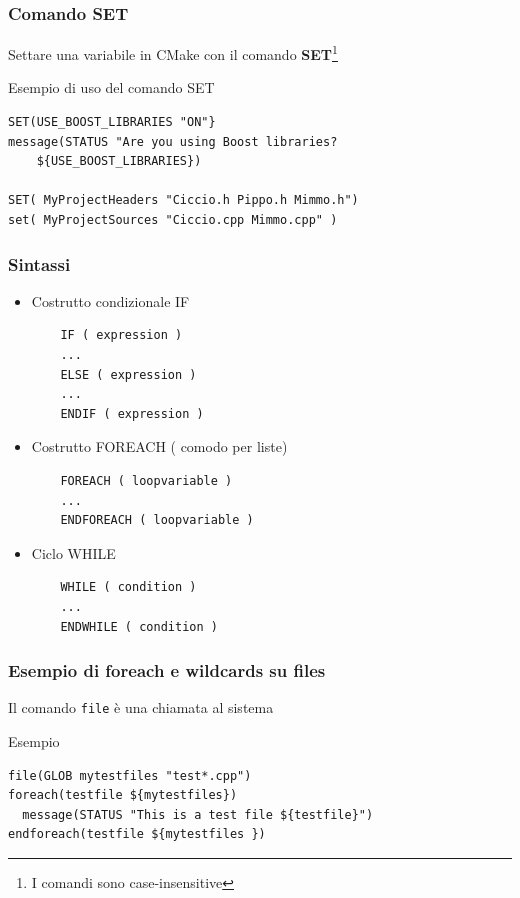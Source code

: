 \documentclass[10pt] {beamer}
\begin{document}

\begin{frame}[fragile]
 \frametitle{Comando SET}
Settare una variabile in CMake con il comando \textbf{SET}\footnote{I comandi sono case-insensitive}
\begin{block}{Esempio di uso del comando SET}
\begin{small}
\begin{verbatim}
SET(USE_BOOST_LIBRARIES "ON"}
message(STATUS "Are you using Boost libraries? 
    ${USE_BOOST_LIBRARIES})

SET( MyProjectHeaders "Ciccio.h Pippo.h Mimmo.h")
set( MyProjectSources "Ciccio.cpp Mimmo.cpp" )
\end{verbatim}
\end{small}
\end{block}
\end{frame}



\begin{frame}[fragile]
	\frametitle{Sintassi}
\begin{itemize}
 \item Costrutto condizionale IF
	\begin{verbatim}
	IF ( expression )
	...
	ELSE ( expression )
	...
	ENDIF ( expression )
	\end{verbatim}
\item Costrutto FOREACH ( comodo per liste)
	\begin{verbatim}
	FOREACH ( loopvariable )
	...
	ENDFOREACH ( loopvariable )
	\end{verbatim}
\item Ciclo WHILE
	\begin{verbatim}
	WHILE ( condition )
	...
	ENDWHILE ( condition )
	\end{verbatim}
\end{itemize}
\end{frame}


\begin{frame}[fragile]
\frametitle{Esempio di foreach e wildcards su files}
Il comando \texttt{file} è una chiamata al sistema
\begin{block}{Esempio}
\begin{small}
\begin{verbatim}
file(GLOB mytestfiles "test*.cpp")
foreach(testfile ${mytestfiles})
  message(STATUS "This is a test file ${testfile}")
endforeach(testfile ${mytestfiles })
\end{verbatim}
\end{small}
\end{block}
\end{frame}
\end{document}
